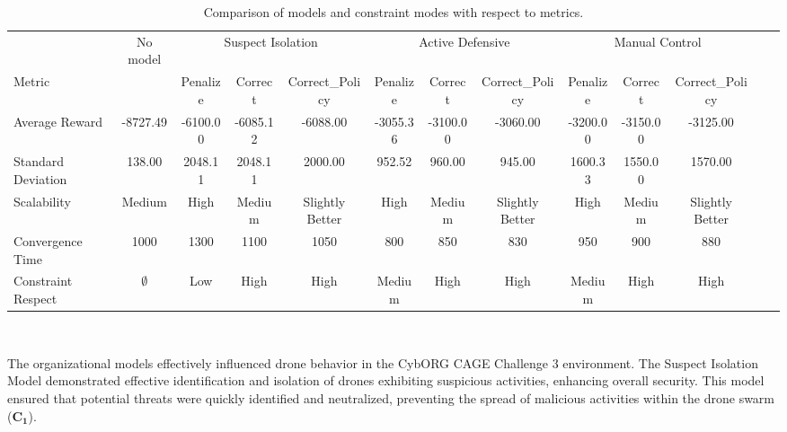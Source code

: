 \documentclass[conference]{IEEEtran}
\begin{document}
\begin{table}[t]
    \centering
    \setlength{\tabcolsep}{4.5pt}
    \caption{Comparison of models and constraint modes with respect to metrics.}
    \label{tab:metrics_comparison}
    \begin{tabular}{lcccccccccccc}
                           & {No model}  & \multicolumn{3}{c}{Suspect Isolation} & \multicolumn{3}{c}{Active Defensive} & \multicolumn{3}{c}{Manual Control}                                                                                 \\
        Metric             &             & Penalize                              & Correct                              & Correct\_Policy                    & Penalize & Correct  & Correct\_Policy & Penalize & Correct  & Correct\_Policy \\
        \midrule
        Average Reward     & -8727.49    & -6100.00                              & -6085.12                             & -6088.00                           & -3055.36 & -3100.00 & -3060.00        & -3200.00 & -3150.00 & -3125.00        \\
        Standard Deviation & 138.00      & 2048.11                               & 2048.11                              & 2000.00                            & 952.52   & 960.00   & 945.00          & 1600.33  & 1550.00  & 1570.00         \\
        Scalability        & Medium      & High                                  & Medium                               & Slightly Better                    & High     & Medium   & Slightly Better & High     & Medium   & Slightly Better \\
        Convergence Time   & 1000        & 1300                                  & 1100                                 & 1050                               & 800      & 850      & 830             & 950      & 900      & 880             \\
        Constraint Respect & $\emptyset$ & Low                                   & High                                 & High                               & Medium   & High     & High            & Medium   & High     & High            \\
    \end{tabular}
\end{table}

\

The organizational models effectively influenced drone behavior in the CybORG CAGE Challenge 3 environment. The Suspect Isolation Model demonstrated effective identification and isolation of drones exhibiting suspicious activities, enhancing overall security. This model ensured that potential threats were quickly identified and neutralized, preventing the spread of malicious activities within the drone swarm ($\mathbf{C_1}$).
\end{document}
